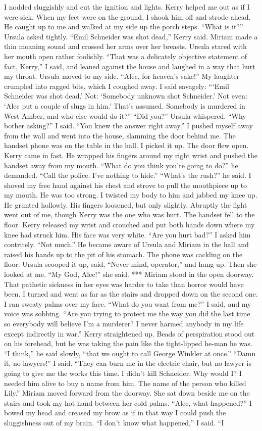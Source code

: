 \documentclass{novel}
\begin{document}
I nodded sluggishly and cut the ignition and lights. Kerry helped me out as if I were sick. When my feet were on the ground, I shook him off and strode ahead. He caught up to me and walked at my side up the porch steps. “What is it?” Ursula asked tightly. “Emil Schneider was shot dead,” Kerry said. Miriam made a thin moaning sound and crossed her arms over her breasts. Ursula stared with her mouth open rather foolishly. “That was a delicately objective statement of fact, Kerry,” I said, and leaned against the house and laughed in a way that hurt my throat. Ursula moved to my side. “Alec, for heaven’s sake!” My laughter crumpled into ragged bits, which I coughed away. I said savagely: “‘Emil Schneider was shot dead.’ Not: ‘Somebody unknown shot Schneider.’ Not even: ‘Alec put a couple of slugs in him.’ That’s assumed. Somebody is murdered in West Amber, and who else would do it?” “Did you?” Ursula whispered. “Why bother asking?” I said. “You knew the answer right away.” I pushed myself away from the wall and went into the house, slamming the door behind me. The handset phone was on the table in the hall. I picked it up. The door flew open. Kerry came in fast. He wrapped his fingers around my right wrist and pushed the handset away from my mouth. “What do you think you’re going to do?” he demanded. “Call the police. I’ve nothing to hide.” “What’s the rush?” he said. I shoved my free hand against his chest and strove to pull the mouthpiece up to my mouth. He was too strong. I twisted my body to him and jabbed my knee up. He grunted hollowly. His fingers loosened, but only slightly. Abruptly the fight went out of me, though Kerry was the one who was hurt. The handset fell to the floor. Kerry released my wrist and crouched and put both hands down where my knee had struck him. His face was very white. “Are you hurt bad?” I asked him contritely. “Not much.” He became aware of Ursula and Miriam in the hall and raised his hands up to the pit of his stomach. The phone was cackling on the floor. Ursula scooped it up, said, “Never mind, operator,” and hung up. Then she looked at me. “My God, Alec!” she said. *** Miriam stood in the open doorway. That pathetic sickness in her eyes was harder to take than horror would have been. I turned and went as far as the stairs and dropped down on the second one. I ran sweaty palms over my face. “What do you want from me?” I said, and my voice was sobbing. “Are you trying to protect me the way you did the last time so everybody will believe I’m a murderer? I never harmed anybody in my life except indirectly in war.” Kerry straightened up. Beads of perspiration stood out on his forehead, but he was taking the pain like the tight-lipped he-man he was. “I think,” he said slowly, “that we ought to call George Winkler at once.” “Damn it, no lawyers!” I said. “They can burn me in the electric chair, but no lawyer is going to give me the works this time. I didn’t kill Schneider. Why would I? I needed him alive to buy a name from him. The name of the person who killed Lily.” Miriam moved forward from the doorway. She sat down beside me on the stairs and took my hot hand between her cold palms. “Alec, what happened?” I bowed my head and creased my brow as if in that way I could push the sluggishness out of my brain. “I don’t know what happened,” I said. “I 
\end{document}
